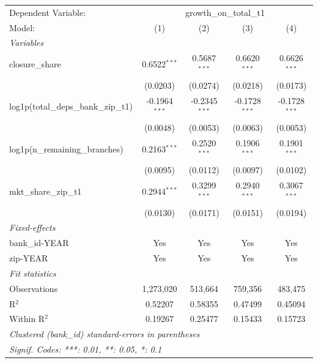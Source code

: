 \begingroup
\centering
\begin{tabular}{lcccc}
   \tabularnewline \midrule \midrule
   Dependent Variable: & \multicolumn{4}{c}{growth\_on\_total\_t1}\\
   Model:                                & (1)             & (2)             & (3)             & (4)\\  
   \midrule
   \emph{Variables}\\
   closure\_share                        & 0.6522$^{***}$  & 0.5687$^{***}$  & 0.6620$^{***}$  & 0.6626$^{***}$\\   
                                         & (0.0203)        & (0.0274)        & (0.0218)        & (0.0173)\\   
   log1p(total\_deps\_bank\_zip\_t1)     & -0.1964$^{***}$ & -0.2345$^{***}$ & -0.1728$^{***}$ & -0.1728$^{***}$\\   
                                         & (0.0048)        & (0.0053)        & (0.0063)        & (0.0053)\\   
   log1p(n\_remaining\_branches)         & 0.2163$^{***}$  & 0.2520$^{***}$  & 0.1906$^{***}$  & 0.1901$^{***}$\\   
                                         & (0.0095)        & (0.0112)        & (0.0097)        & (0.0102)\\   
   mkt\_share\_zip\_t1                   & 0.2944$^{***}$  & 0.3299$^{***}$  & 0.2940$^{***}$  & 0.3067$^{***}$\\   
                                         & (0.0130)        & (0.0171)        & (0.0151)        & (0.0194)\\   
   \midrule
   \emph{Fixed-effects}\\
   bank\_id-YEAR                         & Yes             & Yes             & Yes             & Yes\\  
   zip-YEAR                              & Yes             & Yes             & Yes             & Yes\\  
   \midrule
   \emph{Fit statistics}\\
   Observations                          & 1,273,020       & 513,664         & 759,356         & 483,475\\  
   R$^2$                                 & 0.52207         & 0.58355         & 0.47499         & 0.45094\\  
   Within R$^2$                          & 0.19267         & 0.25477         & 0.15433         & 0.15723\\  
   \midrule \midrule
   \multicolumn{5}{l}{\emph{Clustered (bank\_id) standard-errors in parentheses}}\\
   \multicolumn{5}{l}{\emph{Signif. Codes: ***: 0.01, **: 0.05, *: 0.1}}\\
\end{tabular}
\par\endgroup
